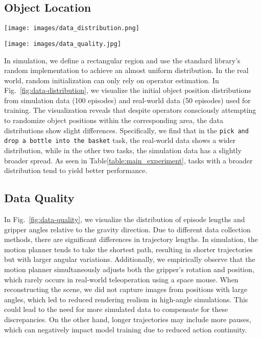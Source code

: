 \subsection{Object Location}
\begin{figure*}[h]
    \centering
    \texttt{[image: images/data\_distribution.png]}
    \caption{\textbf{Data distribution.} We show the initial locations of objects in each task described in Sec.~\ref{sec:experment_sim2real_results}. There are 100 episodes of simulation data(Sim) and 50 episodes of real-world data(Real). We show each cube's location in \texttt{stack blocks} tasks separately.}
    \label{fig:data-distribution}
\end{figure*}
\begin{figure*}[h]
    \centering
    \texttt{[image: images/data\_quality.jpg]}
    \caption{\textbf{Data quality.}  Analysis of differences between real-world and simulation data properties. The first row presents statistical data on the distribution of gripper angles per time step across episodes. The second row displays the Kernel Density Estimate (KDE) of episode lengths. }
    \label{fig:data-quality}
\end{figure*}
In simulation, we define a rectangular region and use the standard library's random implementation to achieve an almost uniform distribution. 
In the real world, random initialization can only rely on operator estimation.
In Fig.~\ref{fig:data-distribution}, we visualize the initial object position distributions from simulation data (100 episodes) and real-world data (50 episodes) used for training. 
The visualization reveals that despite operators consciously attempting to randomize object positions within the corresponding area, the data distributions show slight differences. 
Specifically, we find that in the \texttt{pick and drop a bottle into the basket} task, the real-world data shows a wider distribution, while in the other two tasks, the simulation data has a slightly broader spread. As seen in Table\ref{table:main_experiment}, tasks with a broader distribution tend to yield better performance.

\subsection{Data Quality}
In Fig.~\ref{fig:data-quality}, we visualize the distribution of episode lengths and gripper angles relative to the gravity direction. Due to different data collection methods, there are significant differences in trajectory lengths. In simulation, the motion planner tends to take the shortest path, resulting in shorter trajectories but with larger angular variations. Additionally, we empirically observe that the motion planner simultaneously adjusts both the gripper's rotation and position, which rarely occurs in real-world teleoperation using a space mouse. When reconstructing the scene, we did not capture images from positions with large angles, which led to reduced rendering realism in high-angle simulations. This could lead to the need for more simulated data to compensate for these discrepancies. On the other hand, longer trajectories may include more pauses, which can negatively impact model training due to reduced action continuity. 


